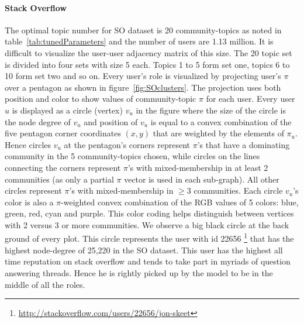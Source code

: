\documentclass{sig-alternate}
\begin{document}
\vspace*{-0.5\baselineskip}
\paragraph{Stack Overflow} 
The optimal topic number for SO dataset is 20 community-topics as noted in
table~\ref{tab:tunedParameters} and the number of users are 1.13 million. It is
difficult to visualize the user-user adjacency matrix of this size. The 20
topic set is divided into four sets with size 5 each. Topics 1 to 5
form set one, topics 6 to 10 form set two and so on. Every user's role is
visualized by projecting user's $\pi$ over a pentagon as shown in
figure~\ref{fig:SOclusters}. The projection uses both position and
color to show values of community-topic $\pi$ for each user.
Every user $u$ is displayed as a circle (vertex) $v_u$ in the figure where the
size of the circle is the node degree of $v_u$ and position of $v_u$ is equal to
a convex combination of the five pentagon corner coordinates $(x, y)$ that are weighted by the
elements of $\pi_u$. Hence circles $v_u$ at the pentagon's corners
represent $\pi$'s that have a dominating community  in the 5
community-topics chosen, while circles on the lines connecting the corners 
represent $\pi$'s with
mixed-membership in at least 2 communities (as only a partial $\pi$ vector is
used in each sub-graph).
All other circles represent $\pi$'s with mixed-membership in $\geq 3$
communities.
Each circle $v_u$'s color is also a $\pi$-weighted convex
combination of the RGB values of 5 colors: blue, green, red, cyan and purple. This
color coding helps distinguish between vertices with 2 versus 3 or more
communities. We observe a big black circle at the back ground of every plot.
This circle represents the user with id 22656
\footnote{\url{http://stackoverflow.com/users/22656/jon-skeet}} that 
has the highest node-degree of 25,220 in the SO dataset. 
This user has the highest all time reputation on
stack overflow and tends to take part in myriads of question answering threads.
Hence he is rightly picked up by the model to be in the middle of all the roles. 
\end{document}
